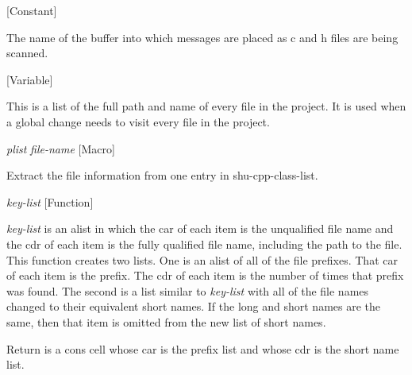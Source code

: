 \vspace{1em}
\noindent
{}
\usebox{\funcname}
 \hfill [Constant]

\begin{doc-string}
The name of the buffer into which messages are placed as c and h files
are being scanned.
\end{doc-string}

\vspace{1em}
\noindent
{}
\usebox{\funcname}
 \hfill [Variable]

\begin{doc-string}
This is a list of the full path and name of every file in the project.
It is used when a global change needs to visit every file in the project.
\end{doc-string}

\vspace{1em}
\noindent
{}
\usebox{\funcname}\emph{plist} \emph{file-name}
 \hfill [Macro]
\hspace*{\wd\funcname}

\begin{doc-string}
Extract the file information from one entry in shu-cpp-class-list.
\end{doc-string}

\vspace{1em}
\noindent
{}
\usebox{\funcname}\emph{key-list}
 \hfill [Function]

\begin{doc-string}
\emph{key-list} is an alist in which the car of each item is the unqualified file
name and the cdr of each item is the fully qualified file name, including the
path to the file.  This function creates two lists.  One is an alist of all of
the file prefixes.  That car of each item is the prefix.  The cdr of each item
is the number of times that prefix was found.  The second is a list similar to
\emph{key-list} with all of the file names changed to their equivalent short names.  If
the long and short names are the same, then that item is omitted from the new
list of short names.

Return is a cons cell whose car is the prefix list and whose cdr is the short
name list.
\end{doc-string}

